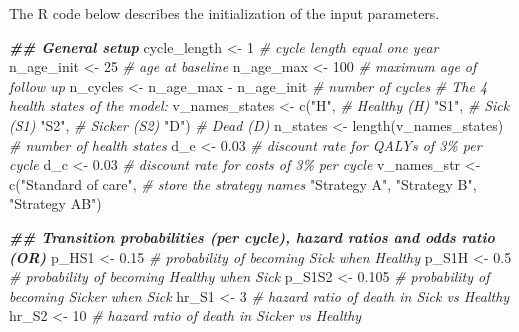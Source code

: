 \documentclass[
]{article}
\newenvironment{Shaded}{\begin{snugshade}}{\end{snugshade}}
\newcommand{\CommentTok}[1]{\textcolor[rgb]{0.56,0.35,0.01}{\textit{#1}}}
\newcommand{\DecValTok}[1]{\textcolor[rgb]{0.00,0.00,0.81}{#1}}
\newcommand{\DocumentationTok}[1]{\textcolor[rgb]{0.56,0.35,0.01}{\textbf{\textit{#1}}}}
\newcommand{\FloatTok}[1]{\textcolor[rgb]{0.00,0.00,0.81}{#1}}
\newcommand{\FunctionTok}[1]{\textcolor[rgb]{0.00,0.00,0.00}{#1}}
\newcommand{\NormalTok}[1]{#1}
\newcommand{\OtherTok}[1]{\textcolor[rgb]{0.56,0.35,0.01}{#1}}
\newcommand{\SpecialCharTok}[1]{\textcolor[rgb]{0.00,0.00,0.00}{#1}}
\newcommand{\StringTok}[1]{\textcolor[rgb]{0.31,0.60,0.02}{#1}}
\begin{document}
The R code below describes the initialization of the input parameters.

\begin{Shaded}
\begin{Highlighting}[]
\DocumentationTok{\#\# General setup}
\NormalTok{cycle\_length }\OtherTok{\textless{}{-}} \DecValTok{1} \CommentTok{\# cycle length equal one year}
\NormalTok{n\_age\_init }\OtherTok{\textless{}{-}} \DecValTok{25}  \CommentTok{\# age at baseline}
\NormalTok{n\_age\_max  }\OtherTok{\textless{}{-}} \DecValTok{100} \CommentTok{\# maximum age of follow up}
\NormalTok{n\_cycles }\OtherTok{\textless{}{-}}\NormalTok{ n\_age\_max }\SpecialCharTok{{-}}\NormalTok{ n\_age\_init }\CommentTok{\# number of cycles}
\CommentTok{\# The 4 health states of the model:}
\NormalTok{v\_names\_states }\OtherTok{\textless{}{-}} \FunctionTok{c}\NormalTok{(}\StringTok{"H"}\NormalTok{,  }\CommentTok{\# Healthy (H)}
                    \StringTok{"S1"}\NormalTok{, }\CommentTok{\# Sick (S1)}
                    \StringTok{"S2"}\NormalTok{, }\CommentTok{\# Sicker (S2)}
                    \StringTok{"D"}\NormalTok{)  }\CommentTok{\# Dead (D)}
\NormalTok{n\_states }\OtherTok{\textless{}{-}} \FunctionTok{length}\NormalTok{(v\_names\_states) }\CommentTok{\# number of health states }
\NormalTok{d\_e }\OtherTok{\textless{}{-}} \FloatTok{0.03} \CommentTok{\# discount rate for QALYs of 3\% per cycle }
\NormalTok{d\_c }\OtherTok{\textless{}{-}} \FloatTok{0.03} \CommentTok{\# discount rate for costs of 3\% per cycle }
\NormalTok{v\_names\_str }\OtherTok{\textless{}{-}} \FunctionTok{c}\NormalTok{(}\StringTok{"Standard of care"}\NormalTok{, }\CommentTok{\# store the strategy names}
                 \StringTok{"Strategy A"}\NormalTok{, }
                 \StringTok{"Strategy B"}\NormalTok{,}
                 \StringTok{"Strategy AB"}\NormalTok{) }

\DocumentationTok{\#\# Transition probabilities (per cycle), hazard ratios and odds ratio (OR)}
\NormalTok{p\_HS1   }\OtherTok{\textless{}{-}} \FloatTok{0.15}  \CommentTok{\# probability of becoming Sick when Healthy}
\NormalTok{p\_S1H   }\OtherTok{\textless{}{-}} \FloatTok{0.5}   \CommentTok{\# probability of becoming Healthy when Sick}
\NormalTok{p\_S1S2  }\OtherTok{\textless{}{-}} \FloatTok{0.105} \CommentTok{\# probability of becoming Sicker when Sick}
\NormalTok{hr\_S1   }\OtherTok{\textless{}{-}} \DecValTok{3}     \CommentTok{\# hazard ratio of death in Sick vs Healthy}
\NormalTok{hr\_S2   }\OtherTok{\textless{}{-}} \DecValTok{10}    \CommentTok{\# hazard ratio of death in Sicker vs Healthy }


\end{Highlighting}
\end{Shaded}
\end{document}
